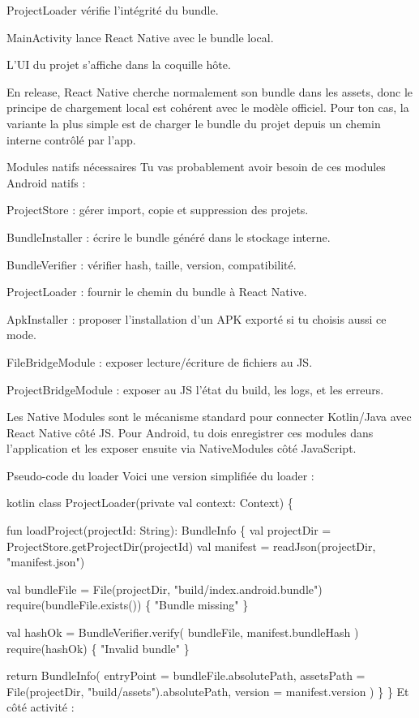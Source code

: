 \documentclass[11pt]{article}
\begin{document}
ProjectLoader vérifie l’intégrité du bundle.

MainActivity lance React Native avec le bundle local.

L’UI du projet s’affiche dans la coquille hôte.

En release, React Native cherche normalement son bundle dans les assets, donc le principe de chargement local est cohérent avec le modèle officiel. Pour ton cas, la variante la plus simple est de charger le bundle du projet depuis un chemin interne contrôlé par l’app.

Modules natifs nécessaires
Tu vas probablement avoir besoin de ces modules Android natifs :

ProjectStore : gérer import, copie et suppression des projets.

BundleInstaller : écrire le bundle généré dans le stockage interne.

BundleVerifier : vérifier hash, taille, version, compatibilité.

ProjectLoader : fournir le chemin du bundle à React Native.

ApkInstaller : proposer l’installation d’un APK exporté si tu choisis aussi ce mode.

FileBridgeModule : exposer lecture/écriture de fichiers au JS.

ProjectBridgeModule : exposer au JS l’état du build, les logs, et les erreurs.

Les Native Modules sont le mécanisme standard pour connecter Kotlin/Java avec React Native côté JS. Pour Android, tu dois enregistrer ces modules dans l’application et les exposer ensuite via NativeModules côté JavaScript.

Pseudo-code du loader
Voici une version simplifiée du loader :

kotlin
class ProjectLoader(private val context: Context) \{

  fun loadProject(projectId: String): BundleInfo \{
    val projectDir = ProjectStore.getProjectDir(projectId)
    val manifest = readJson(projectDir, "manifest.json")

    val bundleFile = File(projectDir, "build/index.android.bundle")
    require(bundleFile.exists()) \{ "Bundle missing" \}

    val hashOk = BundleVerifier.verify(
      bundleFile,
      manifest.bundleHash
    )
    require(hashOk) \{ "Invalid bundle" \}

    return BundleInfo(
      entryPoint = bundleFile.absolutePath,
      assetsPath = File(projectDir, "build/assets").absolutePath,
      version = manifest.version
    )
  \}
\}
Et côté activité :
\end{document}
